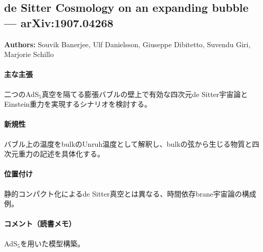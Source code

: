 \subsection{de Sitter Cosmology on an expanding bubble --- arXiv:1907.04268}

\textbf{Authors:} Souvik Banerjee, Ulf Danielsson, Giuseppe Dibitetto, Suvendu Giri, Marjorie Schillo

\paragraph{主な主張}
二つのAdS$_5$真空を隔てる膨張バブルの壁上で有効な四次元de Sitter宇宙論とEinstein重力を実現するシナリオを検討する\cite{Banerjee:2019fzz}。

\paragraph{新規性}
バブル上の温度をbulkのUnruh温度として解釈し、bulkの弦から生じる物質と四次元重力の記述を具体化する。

\paragraph{位置付け}
静的コンパクト化によるde Sitter真空とは異なる、時間依存brane宇宙論の構成例。

\paragraph{コメント（読書メモ）}
AdS$_5$を用いた模型構築。
